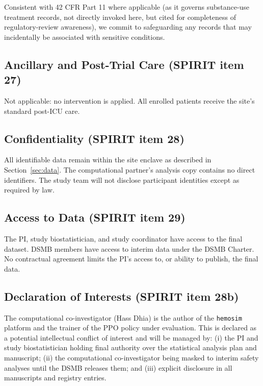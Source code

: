 \documentclass[11pt]{article}
\begin{document}
Consistent with 42 CFR Part 11 where applicable (as it governs substance-use treatment records, not directly invoked here, but cited for completeness of regulatory-review awareness), we commit to safeguarding any records that may incidentally be associated with sensitive conditions.

\subsection{Ancillary and Post-Trial Care (SPIRIT item 27)}

Not applicable: no intervention is applied. All enrolled patients receive the site's standard post-ICU care.

\subsection{Confidentiality (SPIRIT item 28)}

All identifiable data remain within the site enclave as described in Section~\ref{sec:data}. The computational partner's analysis copy contains no direct identifiers. The study team will not disclose participant identities except as required by law.

\subsection{Access to Data (SPIRIT item 29)}

The PI, study biostatistician, and study coordinator have access to the final dataset. DSMB members have access to interim data under the DSMB Charter. No contractual agreement limits the PI's access to, or ability to publish, the final data.

\subsection{Declaration of Interests (SPIRIT item 28b)}

The computational co-investigator (Hass Dhia) is the author of the \texttt{hemosim} platform and the trainer of the PPO policy under evaluation. This is declared as a potential intellectual conflict of interest and will be managed by: (i) the PI and study biostatistician holding final authority over the statistical analysis plan and manuscript; (ii) the computational co-investigator being masked to interim safety analyses until the DSMB releases them; and (iii) explicit disclosure in all manuscripts and registry entries.
\end{document}
